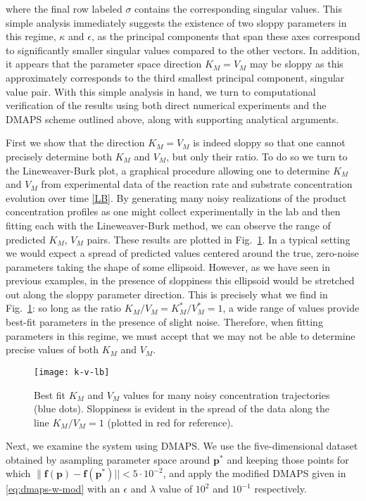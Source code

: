where the final row labeled $\sigma$ contains the corresponding singular values. This simple analysis immediately suggests the existence of two sloppy parameters in this regime, $\kappa$ and $\epsilon$, as the principal components that span these axes correspond to significantly smaller singular values compared to the other vectors. In addition, it appears that the parameter space direction $K_M = V_M$ may be sloppy as this approximately corresponds to the third smallest principal component, singular value pair. With this simple analysis in hand, we turn to computational verification of the results using both direct numerical experiments and the DMAPS scheme outlined above, along with supporting analytical arguments.

First we show that the direction $K_M = V_M$ is indeed sloppy so that one cannot precisely determine both $K_M$ and $V_M$, but only their ratio. To do so we turn to the Lineweaver-Burk plot, a graphical procedure allowing one to determine $K_M$ and $V_M$ from experimental data of the reaction rate and substrate concentration evolution over time \ref{LB}. By generating many noisy realizations of the product concentration profiles as one might collect experimentally in the lab and then fitting each with the Lineweaver-Burk method, we can observe the range of predicted $K_M$, $V_M$ pairs. These results are plotted in Fig.~\ref{fig:lb}. In a typical setting we would expect a spread of predicted values centered around the true, zero-noise parameters taking the shape of some ellipsoid. However, as we have seen in previous examples, in the presence of sloppiness this ellipsoid would be stretched out along the sloppy parameter direction. This is precisely what we find in Fig.~\ref{fig:lb}: so long as the ratio $K_M/V_M = K_M^*/V_M^* = 1$, a wide range of values provide best-fit parameters in the presence of slight noise. Therefore, when fitting parameters in this regime, we must accept that we may not be able to determine precise values of both $K_M$ and $V_M$.


\begin{figure}
  \centering
  \texttt{[image: k-v-lb]}
  \caption[Illustration of sloppiness in Lineweaver-Burk fitting]{Best
    fit $K_M$ and $V_M$ values for many noisy concentration
    trajectories (blue dots). Sloppiness is evident in the spread of
    the data along the line $K_M/V_M = 1$ (plotted in red for
    reference). \label{fig:lb} }
\end{figure}

Next, we examine the system using DMAPS. We use the five-dimensional dataset obtained by asampling parameter space around $\mathbf{p}^*$ and keeping those points for which $\|\mathbf{f(p) - f(p^*)} || < 5  \cdot 10^{-2}$, and apply the modified DMAPS given in \eqref{eq:dmaps-w-mod} with an $\epsilon$ and $\lambda$ value of $10^{2}$ and $10^{-1}$ respectively.

